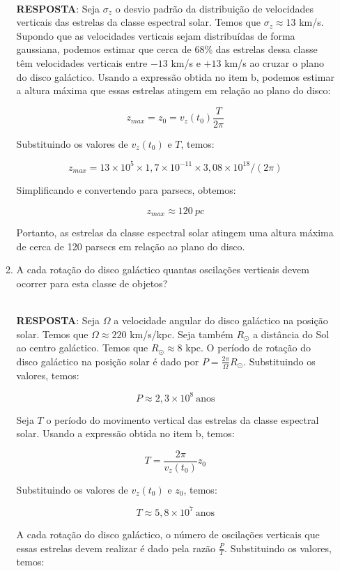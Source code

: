 \documentclass[a4paper,12pt]{article}
\begin{document}
\begin{enumerate}
\begin{enumerate}
\noindent\hrulefill\\\textbf{RESPOSTA}: Seja $\sigma_z$ o desvio padrão da distribuição de velocidades verticais das estrelas da classe espectral solar. Temos que $\sigma_z \approx 13$ km/s. Supondo que as velocidades verticais sejam distribuídas de forma gaussiana, podemos estimar que cerca de 68\% das estrelas dessa classe têm velocidades verticais entre $-13$ km/s e $+13$ km/s ao cruzar o plano do disco galáctico. Usando a expressão obtida no item b, podemos estimar a altura máxima que essas estrelas atingem em relação ao plano do disco:

$$
z_{max} = z_0 = v_z(t_0) \frac{T}{2\pi}
$$

Substituindo os valores de $v_z(t_0)$ e $T$, temos:

$$
z_{max} = 13 \times 10^5 \times 1,7 \times 10^{-11} \times 3,08 \times 10^{18} / (2\pi) 
$$

Simplificando e convertendo para parsecs, obtemos:

$$
z_{max} \approx 120~pc
$$

Portanto, as estrelas da classe espectral solar atingem uma altura máxima de cerca de 120 parsecs em relação ao plano do disco.

\noindent\hrulefill

\item A cada rotação do disco galáctico quantas oscilações verticais devem ocorrer para esta classe de objetos?

\noindent\hrulefill\\\textbf{RESPOSTA}: Seja $\Omega$ a velocidade angular do disco galáctico na posição solar. Temos que $\Omega \approx 220$ km/s/kpc. Seja também $R_\odot$ a distância do Sol ao centro galáctico. Temos que $R_\odot \approx 8$ kpc. O período de rotação do disco galáctico na posição solar é dado por $P = \frac{2\pi}{\Omega} R_\odot$. Substituindo os valores, temos:

$$
P \approx 2,3 \times 10^8~\text{anos}
$$

Seja $T$ o período do movimento vertical das estrelas da classe espectral solar. Usando a expressão obtida no item b, temos:

$$
T = \frac{2\pi}{v_z(t_0)} z_0
$$

Substituindo os valores de $v_z(t_0)$ e $z_0$, temos:

$$
T \approx 5,8 \times 10^7~\text{anos}
$$

A cada rotação do disco galáctico, o número de oscilações verticais que essas estrelas devem realizar é dado pela razão $\frac{P}{T}$. Substituindo os valores, temos:


\end{enumerate}
\end{enumerate}
\end{document}
